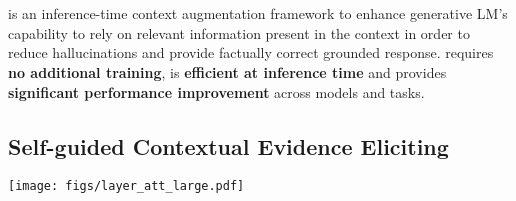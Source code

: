\section{\se}\label{sec:met}

\se is an inference-time context augmentation framework to enhance generative LM's capability to rely on relevant information present in the context in order to reduce hallucinations and provide factually correct grounded response. \se requires \textbf{no additional training}, is \textbf{efficient at inference time} and provides \textbf{significant performance improvement} across models and tasks.

\subsection{Self-guided Contextual Evidence Eliciting}
\label{sec:met-elicit}

\begin{figure*}[t]
\vspace{-5pt}
    \centering
    \texttt{[image: figs/layer\_att\_large.pdf]}
    \caption[evidence reading layers]{
        Relative attention\footnotemark[3] to the evidence/non-evidence sections (y-axis) across the layers (x-axis) for different LM families on HotpotQA.
        Deeper layers pay much greater attention to crucial evidence (green lines) in the context, even when LM responds incorrectly (dashed lines).
        Best viewed in color.
    }
    \label{fig:layeratt}
\vspace{-5pt}
\end{figure*}

